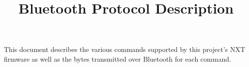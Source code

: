 \documentclass{article}
\title{Bluetooth Protocol Description}
\author{}
\date{}
\begin{document}
	\maketitle

	This document describes the various commands supported by this project's NXT firmware as well as the bytes transmitted over Bluetooth for each command.
\end{document}
